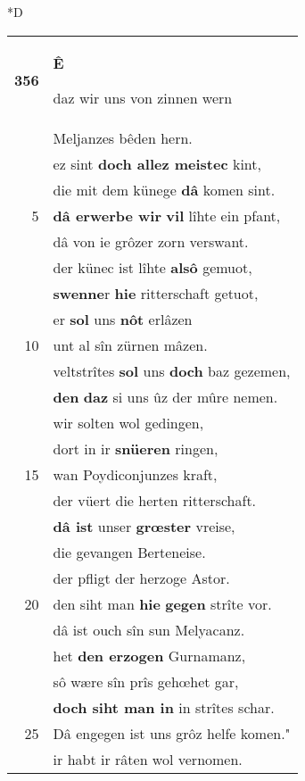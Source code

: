 \documentclass[8pt,a4paper,notitlepage]{article}
\begin{document}
\begin{table}[ht]
\begin{minipage}[t]{0.5\linewidth}
\small
\begin{center}*D
\end{center}
\begin{tabular}{rl}
\textbf{356} & \begin{large}\textbf{Ê}\end{large} daz wir uns von zinnen wern\\ 
 & Meljanzes bêden hern.\\ 
 & ez sint \textbf{doch allez meistec} kint,\\ 
 & die mit dem künege \textbf{dâ} komen sint.\\ 
5 & \textbf{dâ erwerbe wir} \textbf{vil} lîhte ein pfant,\\ 
 & dâ von ie grôzer zorn verswant.\\ 
 & der künec ist lîhte \textbf{alsô} gemuot,\\ 
 & \textbf{swenne}r \textbf{hie} ritterschaft getuot,\\ 
 & er \textbf{sol} uns \textbf{nôt} erlâzen\\ 
10 & unt al sîn zürnen mâzen.\\ 
 & veltstrîtes \textbf{sol} uns \textbf{doch} baz gezemen,\\ 
 & \textbf{den} \textbf{daz} si uns ûz der mûre nemen.\\ 
 & wir solten wol gedingen,\\ 
 & dort in ir \textbf{snüeren} ringen,\\ 
15 & wan Poydiconjunzes kraft,\\ 
 & der vüert die herten ritterschaft.\\ 
 & \textbf{dâ ist} unser \textbf{grœster} vreise,\\ 
 & die gevangen Berteneise.\\ 
 & der pfligt der herzoge Astor.\\ 
20 & den siht man \textbf{hie} \textbf{gegen} strîte vor.\\ 
 & dâ ist ouch sîn sun Melyacanz.\\ 
 & het \textbf{den erzogen} Gurnamanz,\\ 
 & sô wære sîn prîs gehœhet gar,\\ 
 & \textbf{doch siht man in} in strîtes schar.\\ 
25 & Dâ engegen ist uns grôz helfe komen."\\ 
 & ir habt ir râten wol vernomen.\\ 

\end{tabular}
\end{minipage}
\end{table}
\end{document}
